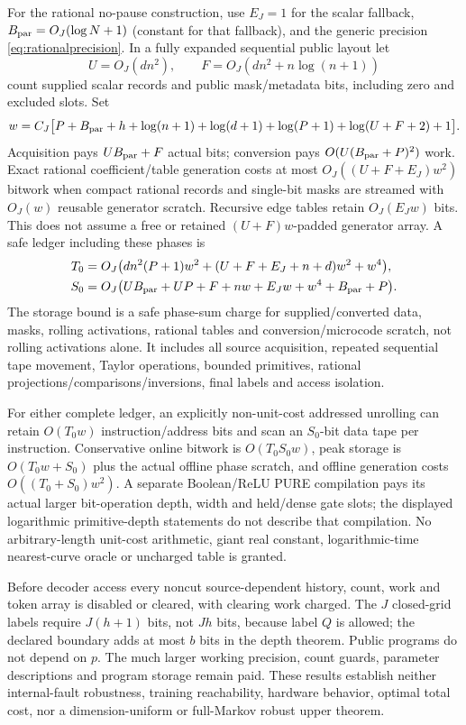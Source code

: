 \documentclass[11pt,letterpaper]{article}
\theoremstyle{definition}\newtheorem{definition}[theorem]{Definition}
\theoremstyle{remark}\newtheorem{remark}[theorem]{Remark}
\begin{document}
For the rational no-pause construction, use $E_J=1$ for the scalar fallback, $B_{\rm par}=O_J(\log N+1)$ (constant for that fallback), and the generic precision \eqref{eq:rationalprecision}. In a fully expanded sequential public layout let
\[
 U=O_J(dn^2),\qquad
 F=O_J(dn^2+n\log(n+1))
\]
count supplied scalar records and public mask/metadata bits, including zero and excluded slots. Set
\[
 w=C_J\bigl[P+B_{\rm par}+h+\log(n+1)+\log(d+1)
            +\log(P+1)+\log(U+F+2)+1\bigr].
\]
Acquisition pays $UB_{\rm par}+F$ actual bits; conversion pays $O(U(B_{\rm par}+P)^2)$ work. Exact rational coefficient/table generation costs at most $O_J((U+F+E_J)w^2)$ bitwork when compact rational records and single-bit masks are streamed with $O_J(w)$ reusable generator scratch. Recursive edge tables retain $O_J(E_Jw)$ bits. This does not assume a free or retained $(U+F)w$-padded generator array. A safe ledger including these phases is
\begin{equation}\label{eq:robustrationalcost}
 \begin{aligned}
 T_0&=O_J\bigl(dn^2(P+1)w^2+(U+F+E_J+n+d)w^2+w^4\bigr),\\
 S_0&=O_J\bigl(UB_{\rm par}+UP+F+nw+E_Jw+w^4+B_{\rm par}+P\bigr).
 \end{aligned}
\end{equation}
The storage bound is a safe phase-sum charge for supplied/converted data, masks, rolling activations, rational tables and conversion/microcode scratch, not rolling activations alone. It includes all source acquisition, repeated sequential tape movement, Taylor operations, bounded primitives, rational projections/comparisons/inversions, final labels and access isolation.

For either complete ledger, an explicitly non-unit-cost addressed unrolling can retain $O(T_0w)$ instruction/address bits and scan an $S_0$-bit data tape per instruction. Conservative online bitwork is $O(T_0S_0w)$, peak storage is $O(T_0w+S_0)$ plus the actual offline phase scratch, and offline generation costs $O((T_0+S_0)w^2)$. A separate Boolean/ReLU PURE compilation pays its actual larger bit-operation depth, width and held/dense gate slots; the displayed logarithmic primitive-depth statements do not describe that compilation. No arbitrary-length unit-cost arithmetic, giant real constant, logarithmic-time nearest-curve oracle or uncharged table is granted.

Before decoder access every noncut source-dependent history, count, work and token array is disabled or cleared, with clearing work charged. The $J$ closed-grid labels require $J(h+1)$ bits, not $Jh$ bits, because label $Q$ is allowed; the declared boundary adds at most $b$ bits in the depth theorem. Public programs do not depend on $p$. The much larger working precision, count guards, parameter descriptions and program storage remain paid. These results establish neither internal-fault robustness, training reachability, hardware behavior, optimal total cost, nor a dimension-uniform or full-Markov robust upper theorem.
\end{document}
